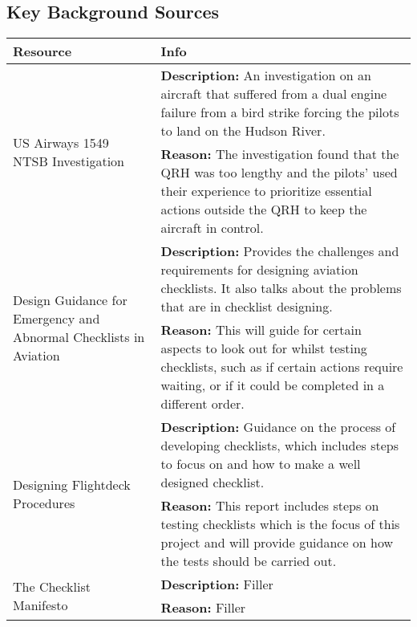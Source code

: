 \documentclass[a4paper]{article}
\begin{document}
\subsection{Key Background Sources}
\begin{tabularx}{\linewidth}{p{8em} X}
    \toprule
    Resource & Info \\
    \midrule
    \multirow{2}{*}{\parbox{8em}{US Airways 1549 NTSB Investigation~\cite{AWE1549}}}
    & \textbf{Description:} An investigation on an aircraft that
        suffered from a dual engine failure from a bird strike
        forcing the pilots to land on the Hudson River. \\
    & \textbf{Reason:} The investigation found that the QRH was too
        lengthy and the pilots' used their experience to prioritize
        essential actions outside the QRH to keep the aircraft in control. \\

    \multirow{2}{*}{\parbox{8em}{Design Guidance for Emergency and Abnormal Checklists in Aviation~\cite{nasa-checklist}}}
    & \textbf{Description:} Provides the challenges and
      requirements for designing aviation checklists.
      It also talks about the problems that are in 
      checklist designing. \\
    & \textbf{Reason:} This will guide for certain aspects to
      look out for whilst testing checklists, such as if
      certain actions require waiting, or if it could be
      completed in a different order. \\

    \multirow{2}{*}{\parbox{8em}{Designing Flightdeck Procedures~\cite{nasa-design}}}
    & \textbf{Description:} Guidance on the process of developing checklists,
      which includes steps to focus on and how to make a well designed
      checklist.\\
    & \textbf{Reason:} This report includes steps on testing checklists
      which is the focus of this project and will provide guidance 
      on how the tests should be carried out. \\

    \multirow{2}{*}{\parbox{8em}{The Checklist Manifesto~\cite{manifesto}}}
    & \textbf{Description:} Filler \\
    & \textbf{Reason:} Filler \\

    \bottomrule
\end{tabularx}

\end{document}
